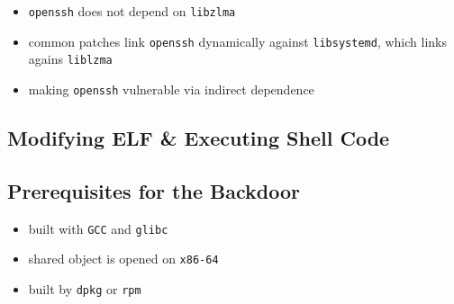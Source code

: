 \begin{itemize}
    \item \texttt{openssh} does not depend on \texttt{libzlma}
    \item common patches link \texttt{openssh} dynamically against \texttt{libsystemd}, which links agains \texttt{liblzma}
    \item making \texttt{openssh} vulnerable via indirect dependence
\end{itemize}

\subsection{Modifying ELF \& Executing Shell Code}

\subsection{Prerequisites for the Backdoor}

\begin{itemize}
    \item built with \texttt{GCC} and \texttt{glibc}
    \item shared object is opened on \texttt{x86-64}
    \item built by \texttt{dpkg} or \texttt{rpm}
\end{itemize}
